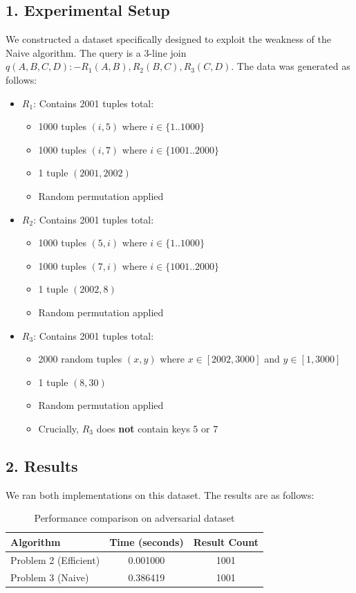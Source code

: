 \documentclass[11pt]{article}
\begin{document}
\subsection*{1. Experimental Setup}
We constructed a dataset specifically designed to exploit the weakness of the Naive algorithm. The query is a 3-line join $q(A, B, C, D) :- R_1(A, B), R_2(B, C), R_3(C, D)$. The data was generated as follows:
\begin{itemize}
    \item $R_1$: Contains 2001 tuples total:
    \begin{itemize}
        \item 1000 tuples $(i, 5)$ where $i \in \{1..1000\}$
        \item 1000 tuples $(i, 7)$ where $i \in \{1001..2000\}$
        \item 1 tuple $(2001, 2002)$
        \item Random permutation applied
    \end{itemize}
    \item $R_2$: Contains 2001 tuples total:
    \begin{itemize}
        \item 1000 tuples $(5, i)$ where $i \in \{1..1000\}$
        \item 1000 tuples $(7, i)$ where $i \in \{1001..2000\}$
        \item 1 tuple $(2002, 8)$
        \item Random permutation applied
    \end{itemize}
    \item $R_3$: Contains 2001 tuples total:
    \begin{itemize}
        \item 2000 random tuples $(x, y)$ where $x \in [2002, 3000]$ and $y \in [1, 3000]$
        \item 1 tuple $(8, 30)$
        \item Random permutation applied
        \item Crucially, $R_3$ does \textbf{not} contain keys $5$ or $7$
    \end{itemize}
\end{itemize}

\subsection*{2. Results}
We ran both implementations on this dataset. The results are as follows:

\begin{table}[h!]
\centering
\begin{tabular}{|l|c|c|}
\hline
\textbf{Algorithm} & \textbf{Time (seconds)} & \textbf{Result Count} \\ \hline
Problem 2 (Efficient) & 0.001000 & 1001 \\ \hline
Problem 3 (Naive)     & 0.386419 & 1001 \\ \hline
\end{tabular}
\caption{Performance comparison on adversarial dataset}
\end{table}
\end{document}
